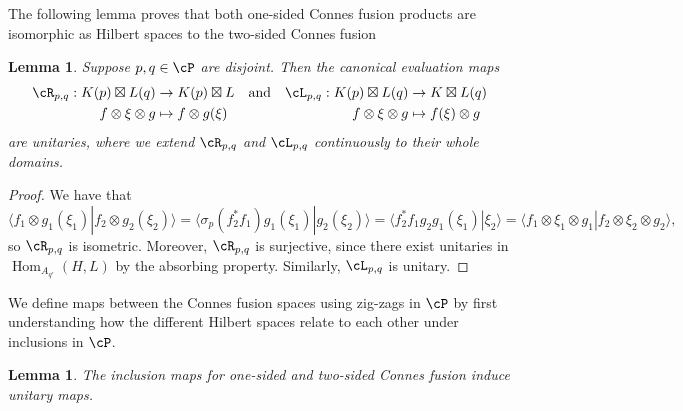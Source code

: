 \documentclass[11pt,reqno]{amsart}
\DeclareMathOperator{\Hom}{Hom}
\numberwithin{equation}{section}
\theoremstyle{plain}
\newtheorem{lemma}[equation]{Lemma}
\theoremstyle{definition}
\begin{document}
The following lemma proves that both one-sided Connes fusion products are isomorphic as Hilbert spaces to the two-sided Connes fusion 

\begin{lemma}\label{lemma:canonical-evaluation-is-unitary}
    Suppose $p,q\in{\cP}$ are disjoint. Then the canonical evaluation maps
    \begin{align*}
        \cR _{p,q}:K(p)\boxtimes L(q)&\to K(p)\boxtimes L 
        & &\text{and}& 
        \cL_{p,q}:K(p)\boxtimes L(q) &\to K\boxtimes L(q)
        \\
        f\otimes\xi\otimes g &\mapsto f\otimes g(\xi)
        &&&
        f\otimes\xi\otimes g&\mapsto f(\xi)\otimes g 
    \end{align*}
    are unitaries, where we extend $\cR_{p, q}$ and $\cL_{p, q}$ continuously to their whole domains.
\end{lemma}

\begin{proof}
    We have that
    \[
    \langle f_1\otimes g_1(\xi_1)|f_2\otimes g_2(\xi_2)\rangle=\langle \sigma_p(f_2^*f_1)g_1(\xi_1)|g_2(\xi_2)\rangle=\langle f_2^*f_1g_2g_1(\xi_1)|\xi_2\rangle=\langle f_1\otimes \xi_1\otimes g_1|f_2\otimes\xi_2\otimes g_2\rangle,
    \]
    so $\cR_{p,q}$ is isometric. Moreover, $\cR_{p,q}$ is surjective, since there exist unitaries in $\Hom_{A_{q'}}(H,L)$ by the absorbing property. Similarly, $\cL_{p,q}$ is unitary.
\end{proof}

We define maps between the Connes fusion spaces using zig-zags in $\cP$ by first understanding how the different Hilbert spaces relate to each other under inclusions in $\cP$.

\begin{lemma}\label{lemma:inclusions-induce-unitaries}
    The inclusion maps for one-sided and two-sided Connes fusion induce unitary maps.
    
\end{lemma}
\end{document}
